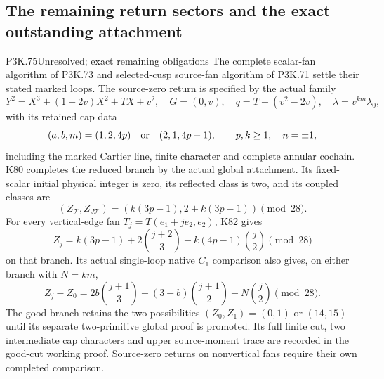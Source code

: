 \subsection{The remaining return sectors and the exact outstanding attachment}
\begin{statement}{P3K.75}{Unresolved; exact remaining obligations}
The complete scalar-fan algorithm of P3K.73 and selected-cusp
source-fan algorithm of P3K.71 settle their stated marked loops.
The source-zero return is specified by the actual family
\[
 Y^2=X^3+(1-2v)X^2+TX+v^2,\quad G=(0,v),\quad
 q=T-(v^2-2v),\quad \lambda=v^{km}\lambda_0,
\]
with its retained cap data
\[
 (a,b,m)=(1,2,4p)\quad\hbox{or}\quad(2,1,4p-1),
 \qquad p,k\ge1,\quad n=\pm1,
\]
including the marked Cartier line, finite character and complete
annular cochain. K80 completes the reduced branch by the actual
global attachment. Its fixed-scalar initial physical integer is
zero, its reflected class is two, and its coupled classes are
\[
 (Z_{\mathcal T},Z_{J\mathcal T})
       =(k(3p-1),2+k(3p-1))\pmod {28}.
\]
For every vertical-edge fan \(T_j=T(e_1+je_2,e_2)\), K82 gives
\[
 Z_j=k(3p-1)+2\binom{j+2}{3}
                    -k(4p-1)\binom j2\pmod {28}
\]
on that branch. Its actual single-loop native \(C_1\) comparison
also gives, on either branch with \(N=km\),
\[
 Z_j-Z_0=2b\binom{j+1}{3}+(3-b)\binom{j+1}{2}
                                     -N\binom j2\pmod {28}.
\]
The good branch retains the two possibilities
\((Z_0,Z_1)=(0,1)\) or \((14,15)\) until its separate
two-primitive global proof is promoted. Its full finite cut,
two intermediate cap characters and upper source-moment trace
are recorded in the good-cut working proof. Source-zero returns
on nonvertical fans require their own completed comparison.


\end{statement}

